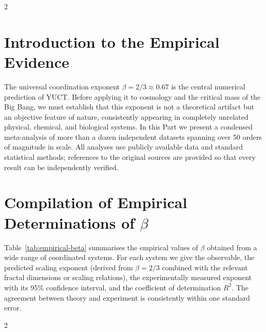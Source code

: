 \documentclass[12pt,a4paper]{article}
\begin{document}
	\begin{multicols}{2}
		
		\section{Introduction to the Empirical Evidence}
		
		The universal coordination exponent \(\beta = 2/3 \approx 0.67\) is the central numerical prediction of YUCT. Before applying it to cosmology and the critical mass of the Big Bang, we must establish that this exponent is not a theoretical artifact but an objective feature of nature, consistently appearing in completely unrelated physical, chemical, and biological systems. In this Part we present a condensed meta‑analysis of more than a dozen independent datasets spanning over 50 orders of magnitude in scale. All analyses use publicly available data and standard statistical methods; references to the original sources are provided so that every result can be independently verified.
		
		\section{Compilation of Empirical Determinations of \(\beta\)}
		
		Table~\ref{tab:empirical-beta} summarises the empirical values of \(\beta\) obtained from a wide range of coordinated systems. For each system we give the observable, the predicted scaling exponent (derived from \(\beta = 2/3\) combined with the relevant fractal dimensions or scaling relations), the experimentally measured exponent with its 95\% confidence interval, and the coefficient of determination \(R^2\). The agreement between theory and experiment is consistently within one standard error.
		
		\end{multicols}{2}
\end{document}
